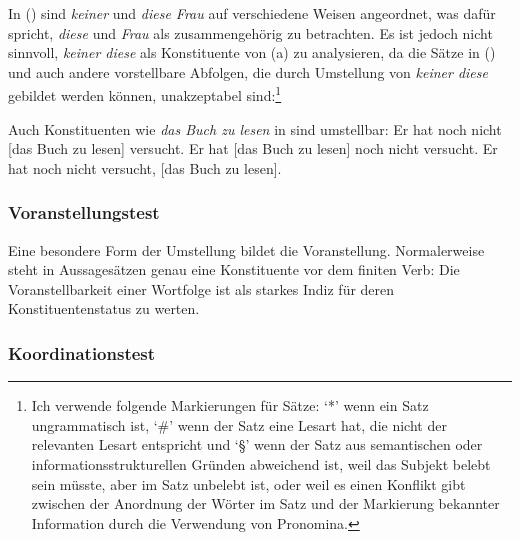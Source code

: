 \documentclass[ number=45
			   ,series=eotms
			   ,printondemand
			  ]{langsci}
\begin{document}
{In () sind \emph{keiner} und \emph{diese Frau} auf verschiedene Weisen angeordnet,
was dafür spricht, \emph{diese} und \emph{Frau} als zusammengehörig zu betrachten.
\eal
{}
\zl
Es ist jedoch nicht sinnvoll, \emph{keiner diese} als Konstituente von (a) zu analysieren,
da die Sätze in () und auch andere vorstellbare Abfolgen, die durch
Umstellung von \emph{keiner diese} gebildet werden können, unakzeptabel sind:\footnote{
  Ich verwende folgende Markierungen für Sätze: `*'\is{*} wenn ein Satz ungrammatisch ist,
  `\#'\is{\#} wenn der Satz eine Lesart hat, die nicht der relevanten Lesart entspricht und
  `\S'\is{\S} wenn der Satz aus semantischen oder informationsstrukturellen Gründen abweichend ist,
  \zb weil das Subjekt belebt sein müsste, aber im Satz unbelebt ist, oder weil es einen
  Konflikt gibt zwischen der Anordnung der Wörter im Satz und der Markierung bekannter
  Information durch die Verwendung von Pronomina.%
}
\eal
{}
\zl

\noindent
Auch Konstituenten wie \emph{das Buch zu lesen} in 
sind umstellbar:
\eal
\ex Er hat noch nicht [das Buch zu lesen] versucht.
\ex Er hat [das Buch zu lesen] noch nicht versucht.
\ex Er hat noch nicht versucht, [das Buch zu lesen].
\zl
{}

\subsubsection{Voranstellungstest}

Eine besondere Form der Umstellung bildet die Voranstellung. Normalerweise steht
in Aussagesätzen genau eine Konstituente vor dem finiten Verb:
\eal
\label{bsp-v2}
\zl
Die Voranstellbarkeit einer Wortfolge ist als starkes Indiz für deren Konstituentenstatus
zu werten.

\subsubsection{Koordinationstest}

}
\end{document}
